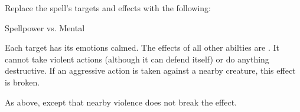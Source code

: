 Replace the spell's targets and effects with the following:
\begin{spellcontent}

\begin{augmenttargetinginfo}




\end{augmenttargetinginfo}


\begin{augmenteffects}




\begin{spellattack}{Spellpower vs. Mental}


\hit
Each target has its emotions calmed.
The effects of all other  abilties are .
It cannot take violent actions (although it can defend itself) or do anything destructive.
If an aggressive action is taken against a nearby creature, this effect is broken.



\crit
As above, except that nearby violence does not break the effect.



\end{spellattack}





\end{augmenteffects}

\end{spellcontent}








